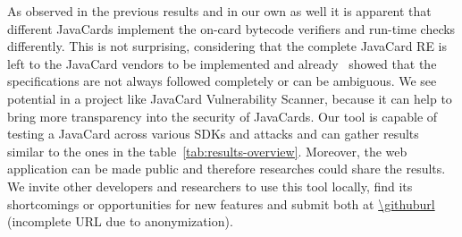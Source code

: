 \documentclass{../llncs/llncs}
\begin{document}
        As observed in the previous results and in our own as well it is apparent that different JavaCards implement the on-card bytecode verifiers and run-time checks differently. This is not surprising, considering that the complete JavaCard RE is left to the JavaCard vendors to be implemented and already~\cite{Mostowski07testingthe} showed that the specifications are not always followed completely or can be ambiguous.
        We see potential in a project like JavaCard Vulnerability Scanner, because it can help to bring more transparency into the security of JavaCards. Our tool is capable of testing a JavaCard across various SDKs and attacks and can gather results similar to the ones in the table~\ref{tab:results-overview}. Moreover, the web application can be made public and therefore researches could share the results. We invite other developers and researchers to use this tool locally, find its shortcomings or opportunities for new features and submit both at \url{\githuburl} (incomplete URL due to anonymization). 

\end{document}
